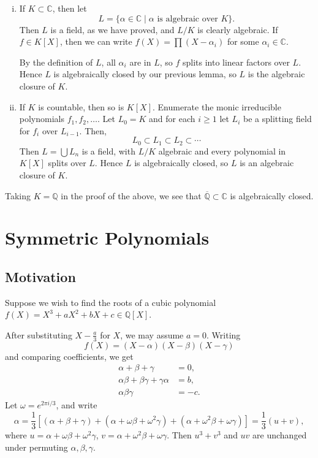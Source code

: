 \documentclass[12pt]{article}
\begin{document}
\begin{proofbox}
	\begin{enumerate}[(i)]
		\item If $K \subset \mathbb{C}$, then let
			\[
				L = \{\alpha \in \mathbb{C} \mid \alpha \text{ is algebraic over }K\}.
			\]
			Then $L$ is a field, as we have proved, and $L/K$ is clearly algebraic. If $f \in K[X]$, then we can write $f(X) = \prod (X - \alpha_i)$ for some $\alpha_i \in \mathbb{C}$.

			By the definition of $L$, all $\alpha_i$ are in $L$, so $f$ splits into linear factors over $L$. Hence $L$ is algebraically closed by our previous lemma, so $L$ is the algebraic closure of $K$.
		\item If $K$ is countable, then so is $K[X]$. Enumerate the monic irreducible polynomials $f_1, f_2, \ldots$. Let $L_0 = K$ and for each $i \geq 1$ let $L_i$ be a splitting field for $f_i$ over $L_{i-1}$. Then,
			\[
			L_0 \subset L_1 \subset L_2 \subset \cdots
			\]
			Then $L = \bigcup L_n$ is a field, with $L/K$ algebraic and every polynomial in $K[X]$ splits over $L$. Hence $L$ is algebraically closed, so $L$ is an algebraic closure of $K$.
	\end{enumerate}
\end{proofbox}

\begin{remark}
	Taking $K = \mathbb{Q}$ in the proof of the above, we see that $\overline{\mathbb{Q}} \subset \mathbb{C}$ is algebraically closed.
\end{remark}

\newpage

\section{Symmetric Polynomials}
\label{sec:sym_polys}

\subsection{Motivation}
\label{sub:sym_mot}

Suppose we wish to find the roots of a cubic polynomial $f(X) = X^3 + aX^2 + bX + c \in \mathbb{Q}[X]$.

After substituting $X - \frac{a}{3}$ for $X$, we may assume $a = 0$. Writing
\[
f(X) = (X-\alpha)(X-\beta)(X-\gamma)
\]
and comparing coefficients, we get
\begin{align*}
	\alpha + \beta + \gamma &= 0,\\
	\alpha\beta + \beta\gamma+\gamma\alpha &= b,\\
	\alpha\beta\gamma &= -c.
\end{align*}
Let $\omega = e^{2\pi i/3}$, and write
\[
	\alpha = \frac{1}{3} [(\alpha+\beta+\gamma)+(\alpha+\omega\beta+\omega^2\gamma)+(\alpha+\omega^2\beta+\omega\gamma)] = \frac{1}{3}(u+v),
\]
where $u = \alpha + \omega\beta + \omega^2\gamma$, $v = \alpha + \omega^2\beta+\omega\gamma$. Then $u^3 + v^3$ and $uv$ are unchanged under permuting $\alpha,\beta,\gamma$.
\end{document}
